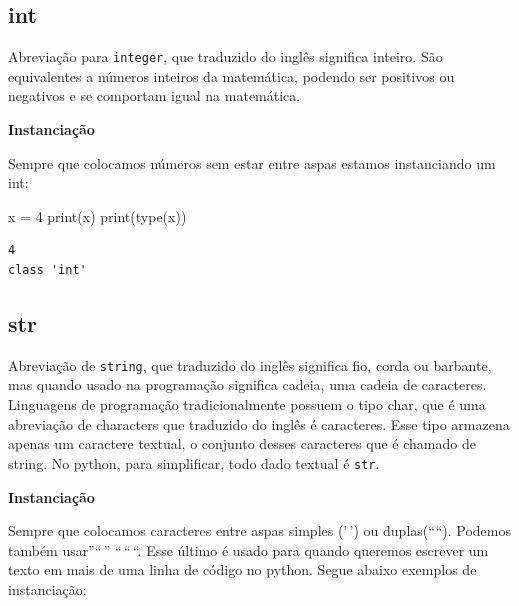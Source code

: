 \documentclass[
  letterpaper,
  DIV=11,
  numbers=noendperiod]{scrreprt}
\newenvironment{Shaded}{\begin{snugshade}}{\end{snugshade}}
\newcommand{\BuiltInTok}[1]{\textcolor[rgb]{0.00,0.23,0.31}{#1}}
\newcommand{\DecValTok}[1]{\textcolor[rgb]{0.68,0.00,0.00}{#1}}
\newcommand{\NormalTok}[1]{\textcolor[rgb]{0.00,0.23,0.31}{#1}}
\newcommand{\OperatorTok}[1]{\textcolor[rgb]{0.37,0.37,0.37}{#1}}
\begin{document}
\hypertarget{int}{%
\subsection{int}\label{int}}

Abreviação para \texttt{integer}, que traduzido do inglês significa
inteiro. São equivalentes a números inteiros da matemática, podendo ser
positivos ou negativos e se comportam igual na matemática.

\textbf{Instanciação}

Sempre que colocamos números sem estar entre aspas estamos instanciando
um int:

\begin{Shaded}
\begin{Highlighting}[]
\NormalTok{x }\OperatorTok{=} \DecValTok{4}
\BuiltInTok{print}\NormalTok{(x)}
\BuiltInTok{print}\NormalTok{(}\BuiltInTok{type}\NormalTok{(x))}
\end{Highlighting}
\end{Shaded}

\begin{tcolorbox}[enhanced jigsaw, breakable, leftrule=.75mm, left=2mm, opacityback=0, bottomrule=.15mm, toprule=.15mm, rightrule=.15mm, arc=.35mm, colback=white]

\begin{verbatim}
4
class 'int'
\end{verbatim}

\end{tcolorbox}

\hypertarget{str}{%
\subsection{str}\label{str}}

Abreviação de \texttt{string}, que traduzido do inglês significa fio,
corda ou barbante, mas quando usado na programação significa cadeia, uma
cadeia de caracteres. Linguagens de programação tradicionalmente possuem
o tipo char, que é uma abreviação de characters que traduzido do inglês
é caracteres. Esse tipo armazena apenas um caractere textual, o conjunto
desses caracteres que é chamado de string. No python, para simplificar,
todo dado textual é \texttt{str}.

\textbf{Instanciação}

Sempre que colocamos caracteres entre aspas simples ('\,') ou
duplas(````). Podemos também usar''``\,'' ``\,``\,``. Esse último é
usado para quando queremos escrever um texto em mais de uma linha de
código no python. Segue abaixo exemplos de instanciação:
\end{document}
